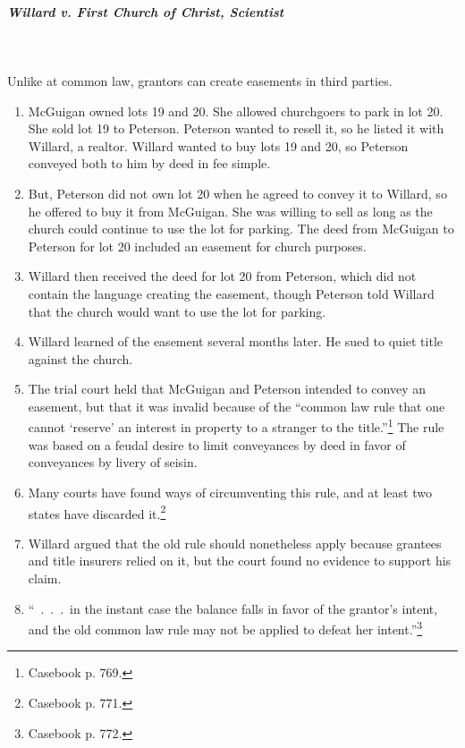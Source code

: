\paragraph{\emph{Willard v. First Church of Christ, Scientist}}
~\\\\
Unlike at common law, grantors can create easements in third parties.

\begin{enumerate}
    \item McGuigan owned lots 19 and 20. She allowed churchgoers to park in 
    lot 20. She sold lot 19 to Peterson. Peterson wanted to resell it, so he 
    listed it with Willard, a realtor. Willard wanted to buy lots 19 and 20, 
    so Peterson conveyed both to him by deed in fee simple.
    \item But, Peterson did not own lot 20 when he agreed to convey it to 
    Willard, so he offered to buy it from McGuigan. She was willing to sell 
    as long as the church could continue to use the lot for parking. The deed 
    from McGuigan to Peterson for lot 20 included an easement for church 
    purposes.
    \item Willard then received the deed for lot 20 from Peterson, which did 
    not contain the language creating the easement, though Peterson told 
    Willard that the church would want to use the lot for parking.
    \item Willard learned of the easement several months later. He sued to 
    quiet title against the church.
    \item The trial court held that McGuigan and Peterson intended to convey 
    an easement, but that it was invalid because of the ``common law rule that 
    one cannot `reserve' an interest in property to a stranger to the 
    title.''\footnote{Casebook p. 769.} The rule was based on a feudal desire 
    to limit conveyances by deed in favor of conveyances by livery of seisin.
    \item Many courts have found ways of circumventing this rule, and at least 
    two states have discarded it.\footnote{Casebook p. 771.}
    \item Willard argued that the old rule should nonetheless apply because 
    grantees and title insurers relied on it, but the court found no evidence 
    to support his claim.
    \item ``~.~.~.~in the instant case the balance falls in favor of the 
    grantor's intent, and the old common law rule may not be applied to defeat 
    her intent.''\footnote{Casebook p. 772.}
\end{enumerate}

